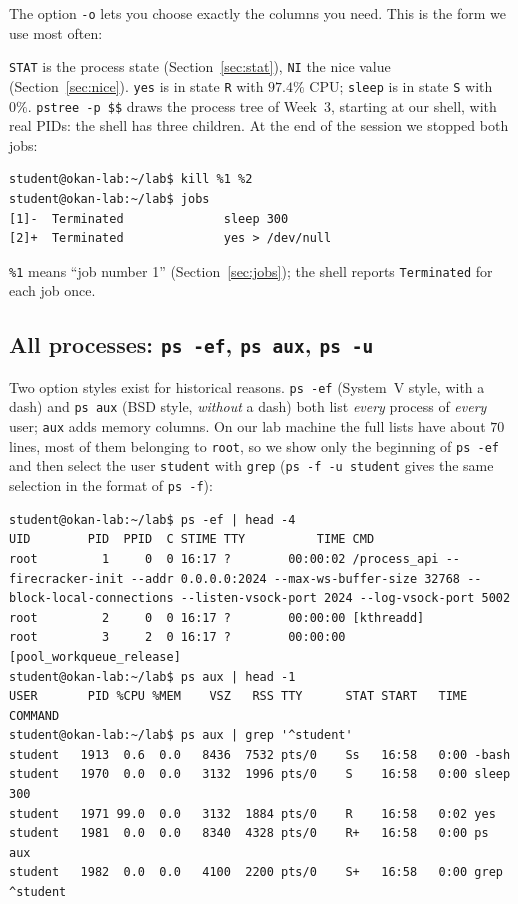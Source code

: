 \documentclass[11pt,a4paper]{article}
\newcommand{\cmd}[1]{\texttt{#1}}
\begin{document}
The option \cmd{-o} lets you choose exactly the columns you need. This is the form we use most often:



\texttt{STAT} is the process state (Section~\ref{sec:stat}), \texttt{NI} the nice value (Section~\ref{sec:nice}). \cmd{yes} is in state \texttt{R} with $97.4\%$ CPU; \cmd{sleep} is in state \texttt{S} with $0\%$. \cmd{pstree -p \$\$} draws the process tree of Week~3, starting at our shell, with real PIDs: the shell has three children. At the end of the session we stopped both jobs:

\begin{lstlisting}[style=wterm]
student@okan-lab:~/lab$ kill %1 %2
student@okan-lab:~/lab$ jobs
[1]-  Terminated              sleep 300
[2]+  Terminated              yes > /dev/null
\end{lstlisting}

\texttt{\%1} means ``job number 1'' (Section~\ref{sec:jobs}); the shell reports \texttt{Terminated} for each job once.

\subsection{All processes: \texttt{ps -ef}, \texttt{ps aux}, \texttt{ps -u}}

Two option styles exist for historical reasons. \cmd{ps -ef} (System~V style, with a dash) and \cmd{ps aux} (BSD style, \emph{without} a dash) both list \emph{every} process of \emph{every} user; \cmd{aux} adds memory columns. On our lab machine the full lists have about $70$ lines, most of them belonging to \texttt{root}, so we show only the beginning of \cmd{ps -ef} and then select the user \texttt{student} with \cmd{grep} (\cmd{ps -f -u student} gives the same selection in the format of \cmd{ps -f}):

\begin{lstlisting}[style=wterm]
student@okan-lab:~/lab$ ps -ef | head -4
UID        PID  PPID  C STIME TTY          TIME CMD
root         1     0  0 16:17 ?        00:00:02 /process_api --firecracker-init --addr 0.0.0.0:2024 --max-ws-buffer-size 32768 --block-local-connections --listen-vsock-port 2024 --log-vsock-port 5002
root         2     0  0 16:17 ?        00:00:00 [kthreadd]
root         3     2  0 16:17 ?        00:00:00 [pool_workqueue_release]
student@okan-lab:~/lab$ ps aux | head -1
USER       PID %CPU %MEM    VSZ   RSS TTY      STAT START   TIME COMMAND
student@okan-lab:~/lab$ ps aux | grep '^student'
student   1913  0.6  0.0   8436  7532 pts/0    Ss   16:58   0:00 -bash
student   1970  0.0  0.0   3132  1996 pts/0    S    16:58   0:00 sleep 300
student   1971 99.0  0.0   3132  1884 pts/0    R    16:58   0:02 yes
student   1981  0.0  0.0   8340  4328 pts/0    R+   16:58   0:00 ps aux
student   1982  0.0  0.0   4100  2200 pts/0    S+   16:58   0:00 grep ^student
\end{lstlisting}
\end{document}
